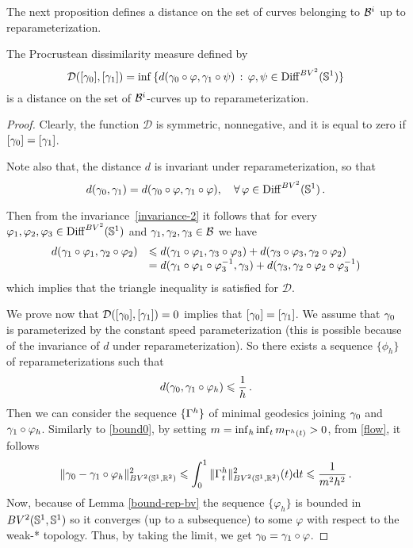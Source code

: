 The next proposition defines a distance on the set of curves belonging to $\mathcal{B}^i$  up to reparameterization. 
 
\begin{prop}\label{distance-geom}
 The Procrustean dissimilarity measure defined by
\begin{equation}
\mathcal{D}([\gamma_0] , [\gamma_1]) = \inf\, \{ d(\gamma_0 \circ \varphi, \gamma_1 \circ \psi ) \,: \,\varphi,\psi \in {\rm{Diff}}^{BV^2}(\mathbb{S}^1)\}
\end{equation}
is a distance on the set of $\mathcal{B}^i$-curves up to reparameterization.
\end{prop}

\begin{proof}
Clearly, the function $\mathcal{D}$ is symmetric, nonnegative, and it is equal to zero if $[\gamma_0] = [\gamma_1]$. 
\par Note also  that, the distance $d$ is invariant under reparameterization, so that   
\begin{equation}\label{invariance-2}
d(\gamma_0,\gamma_1) = d(\gamma_0 \circ \varphi,\gamma_1\circ \varphi), \quad \forall \, \varphi \in {\rm{Diff}}^{BV^2}(\mathbb{S}^1)\,.
\end{equation}

Then from the invariance~\eqref{invariance-2} it follows
that for every $\varphi_1, \varphi_2,\varphi_3 \in  {\rm{Diff}}^{BV^2}(\mathbb{S}^1)$ and $\gamma_1, \gamma_2, \gamma_3 \in \mathcal{B}$ we have 
$$
\begin{array}{ll}
d(\gamma_1\circ\varphi_1,\gamma_2\circ\varphi_2) & \leqslant d(\gamma_1\circ\varphi_1,\gamma_3\circ\varphi_3) + d(\gamma_3\circ\varphi_3,\gamma_2\circ\varphi_2)\\
& =  d(\gamma_1\circ\varphi_1\circ\varphi_3^{-1},\gamma_3) + d(\gamma_3,\gamma_2\circ\varphi_2\circ\varphi_3^{-1})
\end{array}
$$
which implies that the  triangle inequality is satisfied for $\mathcal{D}$. 
\par We prove now that $\mathcal{D}([\gamma_0] , [\gamma_1]) = 0$ implies that $[\gamma_0] = [\gamma_1]$. We assume that $\gamma_0$ is parameterized by the constant speed parameterization (this  is possible because of the invariance of $d$ under reparameterization).
So there exists a sequence $\{\phi_h\}$ of reparameterizations such that 
$$d(\gamma_0,\gamma_1 \circ \varphi_h) \leqslant \frac 1 h\,.$$
Then we can consider the sequence $\{\Gamma^h\}$ of  minimal geodesics joining $\gamma_0$ and $\gamma_1 \circ \varphi_h$. 
Similarly to \eqref{bound0}, by setting $m = \inf_h \inf_t m_{\Gamma^h(t)} > 0$, from \eqref{flow}, it follows 
\begin{equation}\label{bound}\| \gamma_0 - \gamma_1  \circ \varphi_h \|^2_{BV^2(\mathbb{S}^1,\mathbb{R}^2)} \leqslant \int_0^1 \|\Gamma_t^h \|^2_{BV^2(\mathbb{S}^1,\mathbb{R}^2)}(t) \mathrm{d} t \leqslant  \frac{1}{m^2h^2}\,.
\end{equation}
Now,  because of Lemma \ref{bound-rep-bv} the sequence $\{\varphi_h\}$ is bounded in $BV^2(\mathbb{S}^1, \mathbb{S}^1)$ so it converges (up to a subsequence) to some $\varphi$ with respect to the weak-* topology. Thus, by taking the limit, we get  $\gamma_0 = \gamma_1 \circ \varphi$.

\end{proof}

